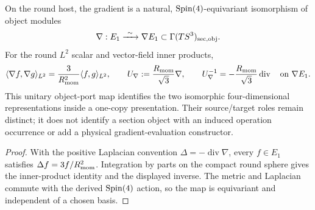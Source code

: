 \documentclass[12pt,a4paper]{article}
\begin{document}
\begin{lemma}
\label{p2b:lem:gradient-port}
On the round host, the gradient is a natural, \(\mathrm{Spin}(4)\)-equivariant
isomorphism of object modules
\[
 \nabla:E_1\xrightarrow{\ \sim\ }\nabla E_1
 \subset\Gamma(TS^3)_{\rm sec,obj}.
\]
For the round \(L^2\) scalar and vector-field inner products,
\[
 \langle\nabla f,\nabla g\rangle_{L^2}
 =\frac3{R_{\mathrm{mom}}^2}\langle f,g\rangle_{L^2},\qquad
 U_\nabla:=\frac{R_{\mathrm{mom}}}{\sqrt3}\nabla,
 \qquad U_\nabla^{-1}=-\frac{R_{\mathrm{mom}}}{\sqrt3}\operatorname{div}
 \quad\text{on }\nabla E_1.
\]
This unitary object-port map identifies the two isomorphic four-dimensional
representations inside a one-copy presentation.  Their source/target roles
remain distinct; it does not identify a section object with an induced
operation occurrence or add a physical gradient-evaluation constructor.
\end{lemma}
\begin{proof}
With the positive Laplacian convention
\(\Delta=-\operatorname{div}\nabla\), every \(f\in E_1\) satisfies
\(\Delta f=3f/R_{\mathrm{mom}}^2\).  Integration by parts on the compact round
sphere gives the inner-product identity and the displayed inverse.
The metric and Laplacian commute with the derived \(\mathrm{Spin}(4)\) action,
so the map is equivariant and independent of a chosen basis.
\end{proof}
\end{document}
